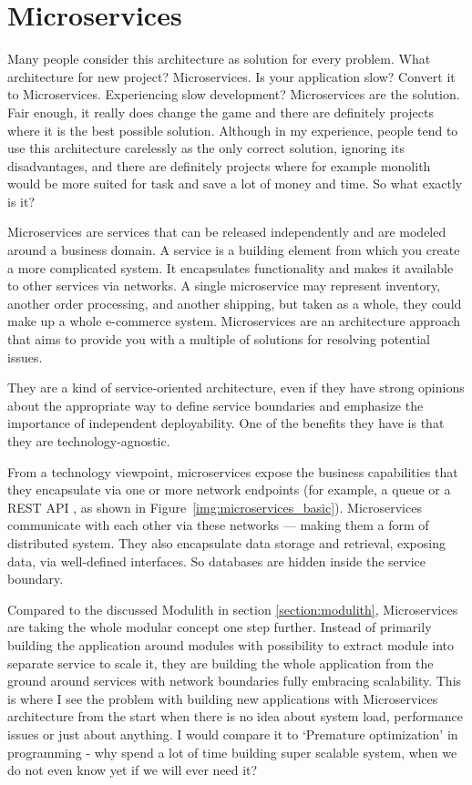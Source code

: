 \section{Microservices}
\label{section:microservices}
Many people consider this architecture as solution for every problem. What architecture for new project? Microservices. Is your application slow? Convert it to Microservices. Experiencing slow development? Microservices are the solution. Fair enough, it really does change the game and there are definitely projects where it is the best possible solution. Although in my experience, people tend to use this architecture carelessly as the only correct solution, ignoring its disadvantages, and there are definitely projects where for example monolith would be more suited for task and save a lot of money and time. So what exactly is it?


Microservices are services that can be released independently and are modeled around a business domain. A service is a building element from which you create a more complicated system. It encapsulates functionality and makes it available to other services via networks. A single microservice may represent inventory, another order processing, and another shipping, but taken as a whole, they could make up a whole e-commerce system. Microservices are an architecture approach that aims to provide you with a multiple of solutions for resolving potential issues. \cite{BUILDING_MS_WHAT_ARE}

They are a kind of service-oriented architecture, even if they have strong opinions about the appropriate way to define service boundaries and emphasize the importance of independent deployability. One of the benefits they have is that they are technology-agnostic. \cite{BUILDING_MS_WHAT_ARE}


From a technology viewpoint, microservices expose the business capabilities that they encapsulate via one or more network endpoints \cite{MON_TO_MS_MICROSERVICE} (for example, a queue or a REST API \cite{BUILDING_MS_WHAT_ARE}, as shown in Figure~\ref{img:microservices_basic}). Microservices communicate with each other via these networks — making them a form of distributed system. They also encapsulate data storage and retrieval, exposing data, via well-defined interfaces. So databases are hidden inside the service boundary. \cite{MON_TO_MS_MICROSERVICE}

Compared to the discussed Modulith in section \ref{section:modulith}, Microservices are taking the whole modular concept one step further. Instead of primarily building the application around modules with possibility to extract module into separate service to scale it, they are building the whole application from the ground around services with network boundaries fully embracing scalability. This is where I see the problem with building new applications with Microservices architecture from the start when there is no idea about system load, performance issues or just about anything. I would compare it to `Premature optimization' in programming - why spend a lot of time building super scalable system, when we do not even know yet if we will ever need it?

